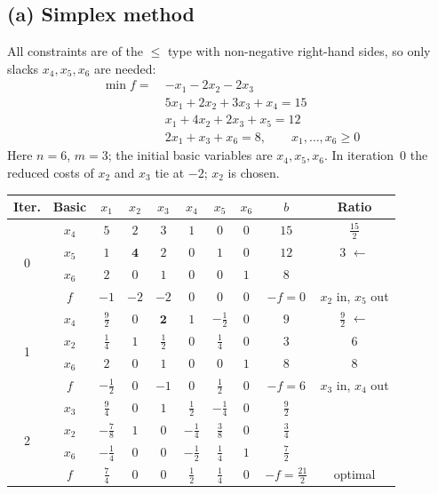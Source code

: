 \documentclass[11pt,a4paper]{article}
\begin{document}
\subsection*{(a) Simplex method}
All constraints are of the $\le$ type with non-negative right-hand sides, so only slacks $x_4,x_5,x_6$ are needed:
\begin{align*}
\min f=\ & -x_1-2x_2-2x_3\\
& 5x_1+2x_2+3x_3+x_4=15\\
& x_1+4x_2+2x_3+x_5=12\\
& 2x_1+x_3+x_6=8,\qquad x_1,\dots,x_6\ge 0
\end{align*}
Here $n=6$, $m=3$; the initial basic variables are $x_4,x_5,x_6$. In iteration~0 the reduced costs of $x_2$ and $x_3$ tie at $-2$; $x_2$ is chosen.

\begin{center}\renewcommand{\arraystretch}{1.35}\setlength{\tabcolsep}{4.5pt}\small
\begin{tabular}{|c|c|cccccc|c|c|}
\hline
\rowcolor{headgray}\textbf{Iter.} & \textbf{Basic} & $x_{1}$ & $x_{2}$ & $x_{3}$ & $x_{4}$ & $x_{5}$ & $x_{6}$ & $b$ & \textbf{Ratio} \\ \hline
\multirow{4}{*}{0} & $x_{4}$ & $5$ & $2$ & $3$ & $1$ & $0$ & $0$ & $15$ & $\tfrac{15}{2}$ \\
 & $x_{5}$ & $1$ & \cellcolor{pivot}$\mathbf{4}$ & $2$ & $0$ & $1$ & $0$ & $12$ & $3$ $\leftarrow$ \\
 & $x_{6}$ & $2$ & $0$ & $1$ & $0$ & $0$ & $1$ & $8$ &  \\
\cline{2-10}
 & $f$ & $-1$ & $-2$ & $-2$ & $0$ & $0$ & $0$ & $-f=0$ & $x_{2}$ in, $x_{5}$ out \\ \hline
\multirow{4}{*}{1} & $x_{4}$ & $\tfrac{9}{2}$ & $0$ & \cellcolor{pivot}$\mathbf{2}$ & $1$ & $-\tfrac{1}{2}$ & $0$ & $9$ & $\tfrac{9}{2}$ $\leftarrow$ \\
 & $x_{2}$ & $\tfrac{1}{4}$ & $1$ & $\tfrac{1}{2}$ & $0$ & $\tfrac{1}{4}$ & $0$ & $3$ & $6$ \\
 & $x_{6}$ & $2$ & $0$ & $1$ & $0$ & $0$ & $1$ & $8$ & $8$ \\
\cline{2-10}
 & $f$ & $-\tfrac{1}{2}$ & $0$ & $-1$ & $0$ & $\tfrac{1}{2}$ & $0$ & $-f=6$ & $x_{3}$ in, $x_{4}$ out \\ \hline
\multirow{4}{*}{2} & $x_{3}$ & $\tfrac{9}{4}$ & $0$ & $1$ & $\tfrac{1}{2}$ & $-\tfrac{1}{4}$ & $0$ & $\tfrac{9}{2}$ &  \\
 & $x_{2}$ & $-\tfrac{7}{8}$ & $1$ & $0$ & $-\tfrac{1}{4}$ & $\tfrac{3}{8}$ & $0$ & $\tfrac{3}{4}$ &  \\
 & $x_{6}$ & $-\tfrac{1}{4}$ & $0$ & $0$ & $-\tfrac{1}{2}$ & $\tfrac{1}{4}$ & $1$ & $\tfrac{7}{2}$ &  \\
\cline{2-10}
 & $f$ & $\tfrac{7}{4}$ & $0$ & $0$ & $\tfrac{1}{2}$ & $\tfrac{1}{4}$ & $0$ & $-f=\tfrac{21}{2}$ & optimal \\ \hline
\end{tabular}\end{center}
\end{document}
